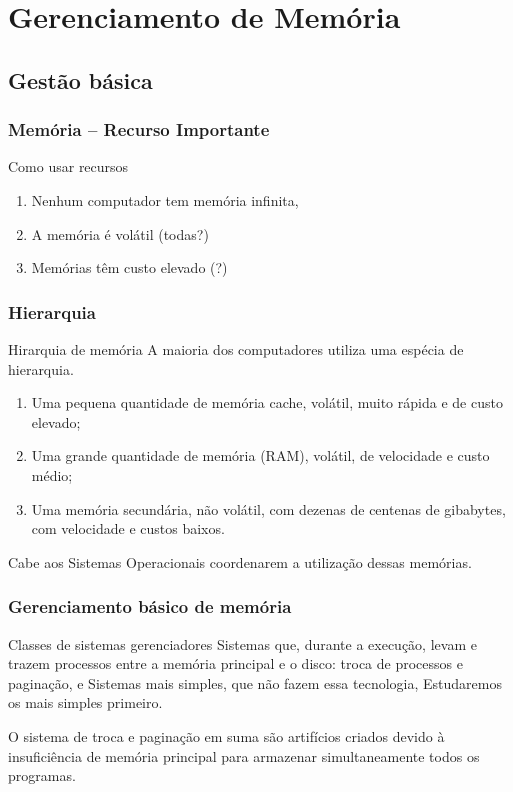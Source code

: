 \documentclass[11pt]{beamer}
\begin{document}
\section{ Gerenciamento de Memória}
\subsection*{ Gestão básica}

\begin{frame}\frametitle{ Memória -- Recurso Importante}
  
\pause
\begin{alertblock} { Como usar recursos}
\begin{enumerate}
\pause
 \item Nenhum computador tem memória infinita,
\pause
 \item A memória é volátil (todas?)
\pause
 \item Memórias têm custo elevado (?)
\end{enumerate}
\end{alertblock} 
\end{frame}

\begin{frame}\frametitle{ Hierarquia}
 \pause
 
\begin{alertblock}{ Hirarquia de memória}
 \pause
 A maioria dos computadores utiliza uma espécia de hierarquia.
 \begin{enumerate}
  \pause
  \item Uma pequena quantidade de memória cache, volátil, muito rápida e de custo elevado;
  \pause
  \item Uma grande quantidade de memória (RAM), volátil, de velocidade e custo médio;
  \pause
  \item Uma memória secundária, não volátil, com dezenas de centenas de gibabytes, com velocidade e custos baixos.
 \end{enumerate}
\pause
 Cabe aos Sistemas Operacionais coordenarem a utilização dessas memórias.

 \end{alertblock}
\end{frame}



\begin{frame}\frametitle{ Gerenciamento básico de memória}
 \pause
 
\begin{block}{ Classes de sistemas gerenciadores}
 \pause
  Sistemas que, durante a execução, levam e trazem processos entre a memória principal e o disco: troca de processos e paginação, e
 \pause
  Sistemas mais simples, que não fazem essa tecnologia, Estudaremos os mais simples primeiro.
 \end{block}
 \pause
 O sistema de troca e paginação em suma são artifícios criados devido à insuficiência de memória principal para armazenar 
 simultaneamente todos os programas.
\end{frame}
\end{document}
